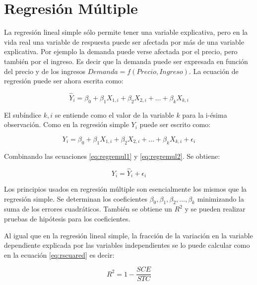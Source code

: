 \documentclass[letterpaper,]{book}
\begin{document}
\hypertarget{regresion-multiple}{%
\section{Regresión Múltiple}\label{regresion-multiple}}

La regresión lineal simple sólo permite tener una variable explicativa, pero en la vida real una variable de respuesta puede ser afectada por más de una variable explicativa. Por ejemplo la demanda puede verse afectada por el precio, pero también por el ingreso. Es decir que la demanda puede ser expresada en función del precio y de los ingresos \(Demanda=f\left(Precio,Ingreso\right)\). La ecuación de regresión puede ser ahora escrita como:

\begin{equation}
\hat{Y}_i = \beta_0 + \beta_1 X_{1,i} + \beta_2 X_{2,i}  + \ldots + \beta_k X_{k,i}
    \label{eq:regremul1}
\end{equation}

El subíndice \(k,i\) se entiende como el valor de la variable \(k\) para la i-ésima observación. Como en la regresión simple \(Y_i\) puede ser escrito como:

\begin{equation}
Y_i = \beta_0 + \beta_1 X_{1,i} + \beta_2 X_{2,i}  + \ldots + \beta_k X_{k,i} + \epsilon_i
    \label{eq:regremul2}
\end{equation}

Combinando las ecuaciones \eqref{eq:regremul1} y \eqref{eq:regremul2}. Se obtiene:

\begin{equation}
Y_i = \hat{Y}_i + \epsilon_i
    \label{eq:regremul3}
\end{equation}

Los principios usados en regresión múltiple son esencialmente los mismos que la regresión simple. Se determinan los coeficientes \(\beta_0,\beta_1,\beta_2,\ldots,\beta_k\) minimizando la suma de los errores cuadráticos. También se obtiene un \(R^2\) y se pueden realizar pruebas de hipótesis para los coeficientes.

Al igual que en la regresión lineal simple, la fracción de la variación en la variable dependiente explicada por las variables independientes se lo puede calcular como en la ecuación \eqref{eq:rscuared} es decir:

\begin{equation}
R^2 = 1 - \dfrac{SCE}{STC}
    \label{eq:rscuared2}
\end{equation}
\end{document}
